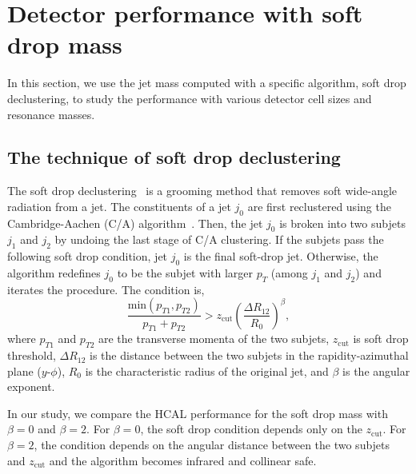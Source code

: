 \section{Detector performance with soft drop mass}

In this section, we use the jet mass computed with a specific algorithm, soft 
drop declustering, to study the performance with various detector 
cell sizes and resonance masses. 

\subsection{The technique of soft drop declustering}
The soft drop declustering~\cite{Larkoski:2014wba} is a grooming method 
that removes soft wide-angle radiation from a jet. The constituents of a jet 
$j_0$ are first reclustered using the Cambridge-Aachen
 (C/A) algorithm~\cite{Dokshitzer:1997in,Wobisch:1998wt}. Then, the jet $j_0$ 
is broken into two subjets $j_1$ and $j_2$ by undoing the last stage of C/A 
clustering.
If the subjets pass the following soft drop condition, jet $j_0$ is the final 
soft-drop jet. Otherwise, the algorithm redefines $j_0$ to be the subjet with 
larger $p_T$ (among $j_1$ and $j_2$) and iterates the procedure. The condition is, 
\begin{equation} \label{eq:soft-drop}
\frac{\mathrm{min}(p_{T1},p_{T2})}{p_{T1}+p_{T2}}>z_\mathrm{cut}(\frac{\Delta R_{12}}{R_{0}})^{\beta},
\end{equation}
where $p_{T1}$ and $p_{T2}$ are the transverse momenta of the two subjets, 
$z_\mathrm{cut}$ is soft drop threshold, 
$\Delta R_{12}$ is the distance between the two subjets in the 
rapidity-azimuthal plane ($y$-$\phi$), $R_0$ is the characteristic radius 
of the original jet, and $\beta$ is the angular exponent.

In our study, we compare the HCAL performance for  the soft drop mass with 
$\beta=0$  and $\beta=2$. For $\beta=0$, the soft drop condition 
depends only on the $z_\mathrm{cut}$. For $\beta=2$, the condition depends on 
the angular distance between the two subjets and $z_\mathrm{cut}$ and the 
algorithm becomes infrared and collinear safe. 

